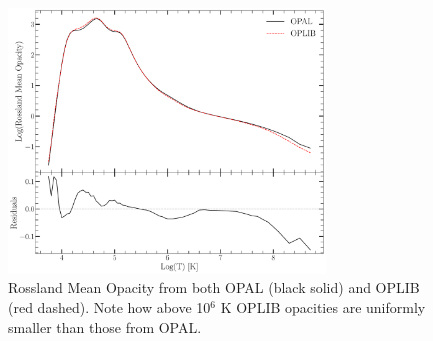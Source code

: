 \begin{figure}
	\centering
	\includegraphics[width=0.75\textwidth]{src/Figures/OpacityComparision.pdf}
	\caption{Rossland Mean Opacity from both OPAL (black solid) and OPLIB (red
	dashed). Note how above 10$^{6}$ K OPLIB opacities are uniformly smaller
	than those from OPAL.}
	\label{fig:opacComp}
\end{figure}

